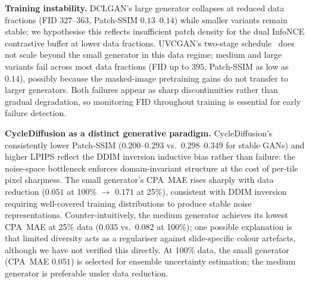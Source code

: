 \noindent\textbf{Training instability.}
DCLGAN's large generator collapses at reduced data fractions (FID $327$--$363$,
Patch-SSIM $0.13$--$0.14$) while smaller variants remain stable; we hypothesise this
reflects insufficient patch density for the dual InfoNCE contrastive buffer at lower
data fractions.
UVCGAN's two-stage schedule~\cite{torbunov2022uvcgan} does not scale beyond the small
generator in this data regime; medium and large variants fail across most data fractions
(FID up to $395$, Patch-SSIM as low as $0.14$), possibly because the masked-image
pretraining gains do not transfer to larger generators.
Both failures appear as sharp discontinuities rather than gradual degradation, so
monitoring FID throughout training is essential for early failure detection.

\noindent\textbf{CycleDiffusion as a distinct generative paradigm.}
CycleDiffusion's consistently lower Patch-SSIM ($0.200$--$0.293$ vs.\ $0.298$--$0.349$
for stable GANs) and higher LPIPS reflect the DDIM inversion inductive bias rather
than failure: the noise-space bottleneck enforces domain-invariant structure at the cost
of per-tile pixel sharpness.
The small generator's CPA~MAE rises sharply with data reduction ($0.051$ at 100\%
$\to$ $0.171$ at 25\%), consistent with DDIM inversion requiring well-covered training
distributions to produce stable noise representations.
Counter-intuitively, the medium generator achieves its lowest CPA~MAE at 25\% data
($0.035$ vs.\ $0.082$ at 100\%); one possible explanation is that limited diversity
acts as a regulariser against slide-specific colour artefacts, although we have not
verified this directly.
At 100\% data, the small generator (CPA~MAE $0.051$) is selected for ensemble
uncertainty estimation; the medium generator is preferable under data reduction.

